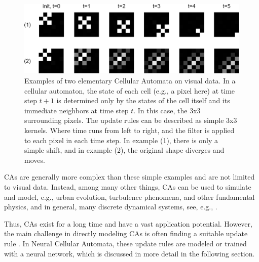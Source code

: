 \begin{figure}[h!]
    \centering
    \includegraphics[width=0.9\linewidth]{Graphics/CA_examples.png}
    \caption{Examples of two elementary Cellular Automata on visual data. In a cellular automaton, the state of each cell (e.g., a pixel here) at time step $t+1$ is determined only by the states of the cell itself and its immediate neighbors at time step $t$. In this case, the 3x3 surrounding pixels. The update rules can be described as simple 3x3 kernels. Where time runs from left to right, and the filter is applied to each pixel in each time step. In example (1), there is only a simple shift, and in example (2), the original shape diverges and moves.}
    \label{fig:ca_exp}
\end{figure}

CAs are generally more complex than these simple examples and are not limited to visual data. Instead, among many other things, CAs can be used to simulate and model, e.g., urban evolution, turbulence phenomena, and other fundamental physics, and in general, many discrete dynamical systems, see, e.g., \autocite{Berto:StanfordSurvey_CA:2022}.

Thus, CAs exist for a long time and have a vast application potential. However, the main challenge in directly modeling CAs is often finding a suitable update rule \cite{Gilpin:2019:IntroduceNCA}. In Neural Cellular Automata, these update rules are modeled or trained with a neural network, which is discussed in more detail in the following section.